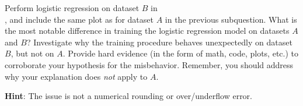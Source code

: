 \item {}
Perform logistic regression on dataset $B$ in \\
, and include the same plot as for dataset $A$ in the previous subquestion.
What is the most notable difference in training the logistic regression model
on datasets $A$ and $B$? Investigate why the training procedure behaves unexpectedly on dataset $B$, but
not on $A$. Provide hard evidence (in the form of math, code, plots, etc.) to
corroborate your hypothesis for the misbehavior. Remember, you should address
why your explanation does \emph{not} apply to $A$.

\textbf{Hint}: The issue is not a numerical rounding or over/underflow error.
